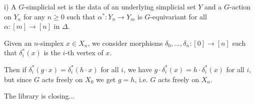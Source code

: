 \documentclass[a4paper,11pt,english]{article}
\begin{document}
\begin{exercise}[3]

i) A $G$-simplicial set is the data of an underlying simplicial set $Y$ and a $G$-action on $Y_n$ for any $n\geq0$ such that $\alpha^*:Y_n\to Y_m$ is $G$-equivariant for all $\alpha:[m]\to[n]$ in $\Delta$.

Given an $n$-simplex $x\in X_n$, we consider morphisms $\delta_0, ..., \delta_n : [0]\to[n]$ such that $\delta^*_i(x)$ is the $i$-th vertex of $x$. 
    
Then if $\delta_i^*(g\cdot x) = \delta_i^*(h\cdot x)$ for all $i$, we have  $g\cdot \delta_i^*(x) = h\cdot \delta_i^*(x)$ for all $i$, but since $G$ acts freely on $X_0$ we get $g=h$, i.e. $G$ acts freely on $X_n$.

The library is closing...

\end{exercise}
\end{document}
